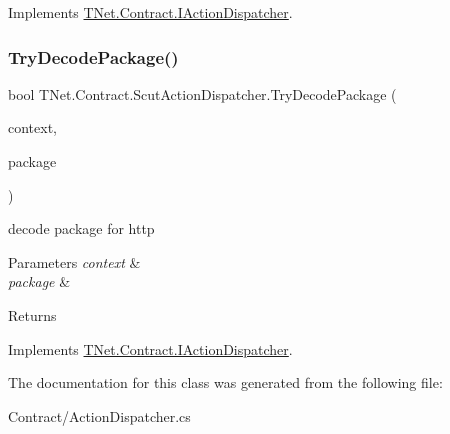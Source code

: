 Implements \mbox{\hyperlink{interface_t_net_1_1_contract_1_1_i_action_dispatcher_a111c0f9bc0cb0c1ba2c72bcbeb0d9ec5}{T\+Net.\+Contract.\+I\+Action\+Dispatcher}}.

\mbox{\label{class_t_net_1_1_contract_1_1_scut_action_dispatcher_a1419151e61eeff45c912074bbf820c26}} 
\subsubsection{\texorpdfstring{Try\+Decode\+Package()}{TryDecodePackage()}\hspace{0.1cm}{\footnotesize\ttfamily [4/4]}}
{\footnotesize\ttfamily bool T\+Net.\+Contract.\+Scut\+Action\+Dispatcher.\+Try\+Decode\+Package (\begin{DoxyParamCaption}\item[{Http\+Context}]{context,  }\item[{out \mbox{\hyperlink{class_t_net_1_1_contract_1_1_request_package}{Request\+Package}}}]{package }\end{DoxyParamCaption})}



decode package for http 


\begin{DoxyParams}{Parameters}
{\em context} & \\
\hline
{\em package} & \\
\hline
\end{DoxyParams}
\begin{DoxyReturn}{Returns}

\end{DoxyReturn}


Implements \mbox{\hyperlink{interface_t_net_1_1_contract_1_1_i_action_dispatcher_a8de9c448c00d87b1e5c5e97aa7304243}{T\+Net.\+Contract.\+I\+Action\+Dispatcher}}.



The documentation for this class was generated from the following file\+:\begin{DoxyCompactItemize}
\item 
Contract/Action\+Dispatcher.\+cs\end{DoxyCompactItemize}
